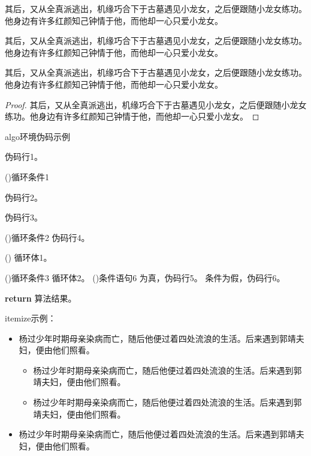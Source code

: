 \documentclass[print, doctor, vlined]{DissertUESTC}
\begin{document}
	\begin{lemma}[名称]
		其后，又从全真派逃出，机缘巧合下于古墓遇见小龙女，之后便跟随小龙女练功。他身边有许多红颜知己钟情于他，而他却一心只爱小龙女。
	\end{lemma}

	\begin{example}[名称]
		其后，又从全真派逃出，机缘巧合下于古墓遇见小龙女，之后便跟随小龙女练功。他身边有许多红颜知己钟情于他，而他却一心只爱小龙女。
	\end{example}

	\begin{assumption}[名称]
		其后，又从全真派逃出，机缘巧合下于古墓遇见小龙女，之后便跟随小龙女练功。他身边有许多红颜知己钟情于他，而他却一心只爱小龙女。
	\end{assumption}
	
	\begin{proof}
		其后，又从全真派逃出，机缘巧合下于古墓遇见小龙女，之后便跟随小龙女练功。他身边有许多红颜知己钟情于他，而他却一心只爱小龙女。
	\end{proof}
	

	\begin{algo}[!h]
		\caption{algo环境伪码示例}

		伪码行1。
		
		\For(){循环条件1}{
			伪码行2。
			
			伪码行3。
			
			\DoWhile(){循环条件2}{
				伪码行4。
			}
			
			\Loop(){
				循环体1。
			}
			
			\Repeat(){循环条件3}{
				循环体2。
			}
			\eIf(){条件语句6}{
				为真，伪码行5。
			}{
				条件为假，伪码行6。
			}
		}
		\textbf{return} 算法结果。
	\end{algo}
	

	itemize示例：

	\begin{itemize}
		\item 杨过少年时期母亲染病而亡，随后他便过着四处流浪的生活。后来遇到郭靖夫妇，便由他们照看。
		\begin{itemize}
			\item 杨过少年时期母亲染病而亡，随后他便过着四处流浪的生活。后来遇到郭靖夫妇，便由他们照看。
			\item 杨过少年时期母亲染病而亡，随后他便过着四处流浪的生活。后来遇到郭靖夫妇，便由他们照看。
		\end{itemize}
		\item 杨过少年时期母亲染病而亡，随后他便过着四处流浪的生活。后来遇到郭靖夫妇，便由他们照看。
	\end{itemize}
\end{document}
